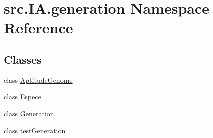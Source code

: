\hypertarget{namespacesrc_1_1_i_a_1_1generation}{}\section{src.\+I\+A.\+generation Namespace Reference}
\label{namespacesrc_1_1_i_a_1_1generation}
\subsection*{Classes}
\begin{DoxyCompactItemize}
\item 
class \hyperlink{classsrc_1_1_i_a_1_1generation_1_1_aptitude_genome}{Aptitude\+Genome}
\item 
class \hyperlink{classsrc_1_1_i_a_1_1generation_1_1_espece}{Espece}
\item 
class \hyperlink{classsrc_1_1_i_a_1_1generation_1_1_generation}{Generation}
\item 
class \hyperlink{classsrc_1_1_i_a_1_1generation_1_1test_generation}{test\+Generation}
\end{DoxyCompactItemize}
